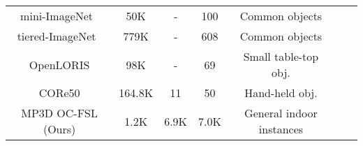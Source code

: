 \begin{table}[t]
\begin{minipage}[t]{0.53\textwidth}
\begin{small}
\begin{center}
{\begin{tabular}{ccccccc}
mini-ImageNet~\citep{matchingnet}& 50K        & -           & 100        & Common objects               \\
tiered-ImageNet~\citep{fewshotssl}& 779K      & -           & 608        & Common objects               \\
OpenLORIS  \citep{openloris}   & 98K          & -           & 69         & Small table-top obj.         \\ 
CORe50  \citep{core50}         & 164.8K       & 11          & 50         & Hand-held obj.               \\
\midrule                                                                                                          
MP3D OC-FSL (Ours)            & 1.2K         & 6.9K        & 7.0K       & General indoor instances     \\
\bottomrule
\end{tabular}
}
\end{center}
\end{small}
\end{minipage}
\vspace{-0.2in}
\end{table}
